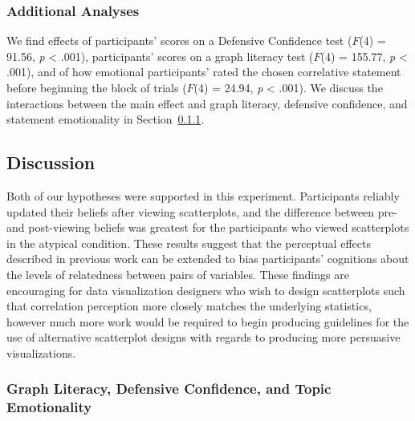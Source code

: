 \documentclass[manuscript,screen,review,anonymous]{acmart}
\begin{document}
\subsubsection{Additional Analyses}\label{sec-add-analyses}

We find effects of participants' scores on a Defensive Confidence test
(\(F\)(4) = 91.56, \emph{p} \textless{} .001), participants' scores on a
graph literacy test (\(F\)(4) = 155.77, \emph{p} \textless{} .001), and
of how emotional participants' rated the chosen correlative statement
before beginning the block of trials (\(F\)(4) = 24.94, \emph{p}
\textless{} .001). We discuss the interactions between the main effect
and graph literacy, defensive confidence, and statement emotionality in
Section~\ref{sec-add-analyses-discussion}.

\subsection{Discussion}\label{sec-main-discussion}

Both of our hypotheses were supported in this experiment. Participants
reliably updated their beliefs after viewing scatterplots, and the
difference between pre- and post-viewing beliefs was greatest for the
participants who viewed scatterplots in the atypical condition. These
results suggest that the perceptual effects described in previous work
can be extended to bias participants' cognitions about the levels of
relatedness between pairs of variables. These findings are encouraging
for data visualization designers who wish to design scatterplots such
that correlation perception more closely matches the underlying
statistics, however much more work would be required to begin producing
guidelines for the use of alternative scatterplot designs with regards
to producing more persuasive visualizations.

\subsubsection{Graph Literacy, Defensive Confidence, and Topic
Emotionality}\label{sec-add-analyses-discussion}
\end{document}
